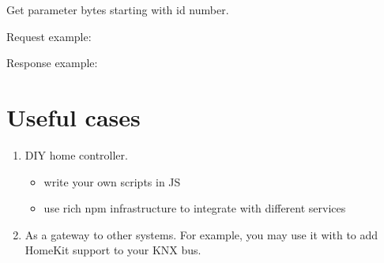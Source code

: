 \documentclass[letterpaper,10pt,english]{sphinxmanual}
\begin{document}

Get parameter bytes starting with id number.

Request example:

%
\begin{sphinxVerbatim}[commandchars=\\\{\}]
   
    
     
    
     
\end{sphinxVerbatim}

Response example:

%
\begin{sphinxVerbatim}[commandchars=\\\{\}]
          
\end{sphinxVerbatim}


\section{Useful cases}
\label{\detokenize{bobaos:useful-cases}}\label{\detokenize{bobaos:useful-cases}}\begin{enumerate}
\item {} 
DIY home controller.
\begin{itemize}
\item {} 
write your own scripts in JS

\item {} 
use rich npm infrastructure to integrate with different services

\end{itemize}

\item {} 
As a gateway to other systems. For example, you may use it with  to add HomeKit support to your KNX bus.

\end{enumerate}
\end{document}
